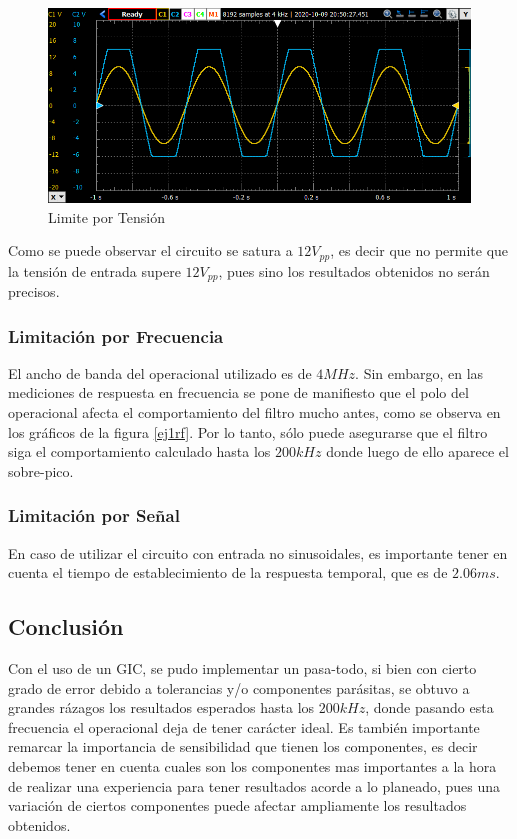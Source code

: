 \begin{figure}[H]
    \centering
    \includegraphics[scale = 0.8]{../Ejercicio1-FiltroConGIC/Informe/limtensionpng.png}
    \caption{Limite por Tensión}
    \label{ej1limt}
\end{figure}

Como se puede observar el circuito se satura a $12V_{pp}$, es decir que no permite que la tensión de entrada supere $12V_{pp}$, pues sino los resultados obtenidos no serán precisos.

\subsubsection{Limitación por Frecuencia}

El ancho de banda del operacional utilizado es de $4MHz$. Sin embargo, en las mediciones de respuesta en frecuencia se pone de manifiesto que el polo del operacional afecta el comportamiento del filtro mucho antes, como se observa en los gr\'aficos de la figura \ref{ej1rf}. Por lo tanto, s\'olo puede asegurarse que el filtro siga el comportamiento calculado hasta los $200kHz$ donde luego de ello aparece el sobre-pico.

\subsubsection{Limitación por Señal}

En caso de utilizar el circuito con entrada no sinusoidales, es importante tener en cuenta el tiempo de establecimiento de la respuesta temporal, que es de $2.06ms$. 

\subsection{Conclusión}

Con el uso de un GIC, se pudo implementar un pasa-todo, si bien con cierto grado de error debido a tolerancias y/o componentes parásitas, se obtuvo a grandes rázagos los resultados esperados hasta los $200kHz$, donde pasando esta frecuencia el operacional deja de tener carácter ideal. Es también importante remarcar la importancia de sensibilidad que tienen los componentes, es decir debemos tener en cuenta cuales son los componentes mas importantes a la hora de realizar una experiencia para tener resultados acorde a lo planeado, pues una variación de ciertos componentes puede afectar ampliamente los resultados obtenidos. 

